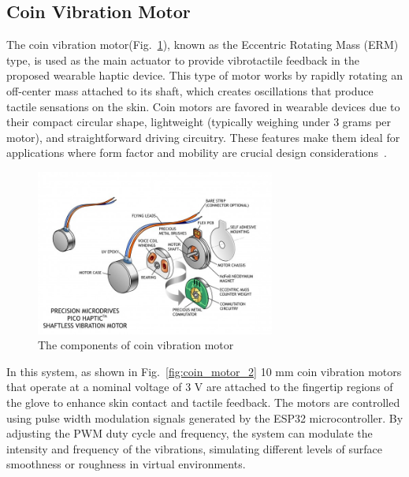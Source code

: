 \newpage
\subsection{Coin Vibration Motor}
The coin vibration motor(Fig.~\ref{fig:coin_motor}), known as the Eccentric Rotating Mass (ERM) type, is used as the main actuator to provide vibrotactile feedback in the proposed wearable haptic device. This type of motor works by rapidly rotating an off-center mass attached to its shaft, which creates oscillations that produce tactile sensations on the skin. Coin motors are favored in wearable devices due to their compact circular shape, lightweight (typically weighing under 3 grams per motor), and straightforward driving circuitry. These features make them ideal for applications where form factor and mobility are crucial design considerations~\cite{coin_motor}.

\begin{figure}[H]\centering
	\includegraphics[width=0.7\textwidth]{Pictures/coin_motor.jpg}%
	\caption{The components of coin vibration motor~\cite{coin_motor}}\label{fig:coin_motor}%
\end{figure}

In this system, as shown in Fig.~\ref{fig:coin_motor_2} 10 mm coin vibration motors that operate at a nominal voltage of 3 V are attached to the fingertip regions of the glove to enhance skin contact and tactile feedback. The motors are controlled using pulse width modulation signals generated by the ESP32 microcontroller. By adjusting the PWM duty cycle and frequency, the system can modulate the intensity and frequency of the vibrations, simulating different levels of surface smoothness or roughness in virtual environments.


